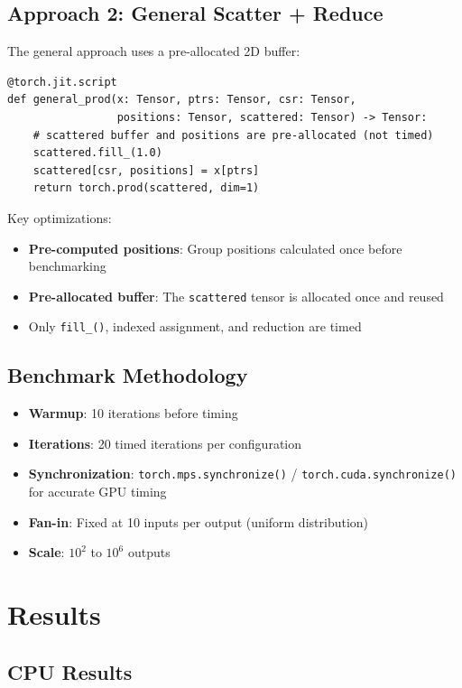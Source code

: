 \documentclass[11pt]{article}
\begin{document}
\subsection{Approach 2: General Scatter + Reduce}

The general approach uses a pre-allocated 2D buffer:

\begin{lstlisting}
@torch.jit.script
def general_prod(x: Tensor, ptrs: Tensor, csr: Tensor, 
                 positions: Tensor, scattered: Tensor) -> Tensor:
    # scattered buffer and positions are pre-allocated (not timed)
    scattered.fill_(1.0)
    scattered[csr, positions] = x[ptrs]
    return torch.prod(scattered, dim=1)
\end{lstlisting}

Key optimizations:
\begin{itemize}
    \item \textbf{Pre-computed positions}: Group positions calculated once before benchmarking
    \item \textbf{Pre-allocated buffer}: The \texttt{scattered} tensor is allocated once and reused
    \item Only \texttt{fill\_()}, indexed assignment, and reduction are timed
\end{itemize}

\subsection{Benchmark Methodology}

\begin{itemize}
    \item \textbf{Warmup}: 10 iterations before timing
    \item \textbf{Iterations}: 20 timed iterations per configuration
    \item \textbf{Synchronization}: \texttt{torch.mps.synchronize()} / \texttt{torch.cuda.synchronize()} for accurate GPU timing
    \item \textbf{Fan-in}: Fixed at 10 inputs per output (uniform distribution)
    \item \textbf{Scale}: $10^2$ to $10^6$ outputs
\end{itemize}

\section{Results}

\subsection{CPU Results}
\end{document}
